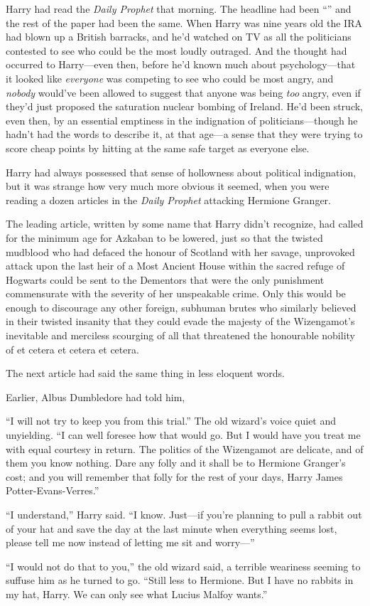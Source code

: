 Harry had read the \emph{Daily Prophet} that morning. The headline had been “” and the rest of the paper had been the same. When Harry was nine years old the IRA had blown up a British barracks, and he’d watched on TV as all the politicians contested to see who could be the most loudly outraged. And the thought had occurred to Harry—even then, before he’d known much about psychology—that it looked like \emph{everyone} was competing to see who could be most angry, and \emph{nobody} would’ve been allowed to suggest that anyone was being \emph{too} angry, even if they’d just proposed the saturation nuclear bombing of Ireland. He’d been struck, even then, by an essential emptiness in the indignation of politicians—though he hadn’t had the words to describe it, at that age—a sense that they were trying to score cheap points by hitting at the same safe target as everyone else.

Harry had always possessed that sense of hollowness about political indignation, but it was strange how very much more obvious it seemed, when you were reading a dozen articles in the \emph{Daily Prophet} attacking Hermione Granger.

The leading article, written by some name that Harry didn’t recognize, had called for the minimum age for Azkaban to be lowered, just so that the twisted mudblood who had defaced the honour of Scotland with her savage, unprovoked attack upon the last heir of a Most Ancient House within the sacred refuge of Hogwarts could be sent to the Dementors that were the only punishment commensurate with the severity of her unspeakable crime. Only this would be enough to discourage any other foreign, subhuman brutes who similarly believed in their twisted insanity that they could evade the majesty of the Wizengamot’s inevitable and merciless scourging of all that threatened the honourable nobility of et cetera et cetera et cetera.

The next article had said the same thing in less eloquent words.

Earlier, Albus Dumbledore had told him,

\begin{em}
“I will not try to keep you from this trial.” The old wizard’s voice quiet and unyielding. “I can well foresee how that would go. But I would have you treat me with equal courtesy in return. The politics of the Wizengamot are delicate, and of them you know nothing. Dare any folly and it shall be to Hermione Granger’s cost; and you will remember that folly for the rest of your days, Harry James Potter-Evans-Verres.”

“I understand,” Harry said. “I know. Just—if you’re planning to pull a rabbit out of your hat and save the day at the last minute when everything seems lost, please tell me now instead of letting me sit and worry—”

“I would not do that to you,” the old wizard said, a terrible weariness seeming to suffuse him as he turned to go. “Still less to Hermione. But I have no rabbits in my hat, Harry. We can only see what Lucius Malfoy wants.”
\end{em}

